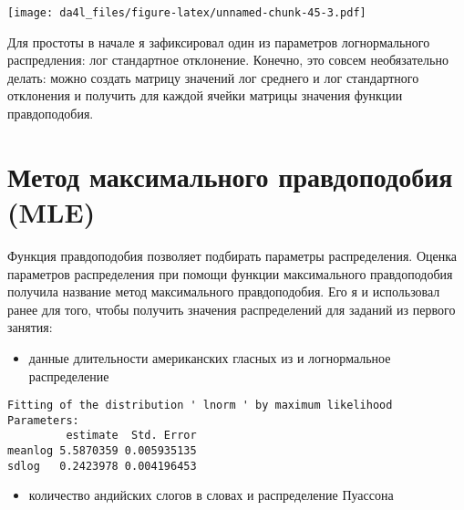\documentclass[
]{book}
\newenvironment{Shaded}{\begin{snugshade}}{\end{snugshade}}
\newcommand{\AttributeTok}[1]{\textcolor[rgb]{0.77,0.63,0.00}{#1}}
\newcommand{\FunctionTok}[1]{\textcolor[rgb]{0.00,0.00,0.00}{#1}}
\newcommand{\NormalTok}[1]{#1}
\newcommand{\SpecialCharTok}[1]{\textcolor[rgb]{0.00,0.00,0.00}{#1}}
\newcommand{\StringTok}[1]{\textcolor[rgb]{0.31,0.60,0.02}{#1}}
\providecommand{\tightlist}{%
  \setlength{\itemsep}{0pt}\setlength{\parskip}{0pt}}
\begin{document}
\texttt{[image: da4l\_files/figure-latex/unnamed-chunk-45-3.pdf]}

Для простоты в начале я зафиксировал один из параметров логнормального распредления: лог стандартное отклонение. Конечно, это совсем необязательно делать: можно создать матрицу значений лог среднего и лог стандартного отклонения и получить для каждой ячейки матрицы значения функции правдоподобия.

\hypertarget{ux43cux435ux442ux43eux434-ux43cux430ux43aux441ux438ux43cux430ux43bux44cux43dux43eux433ux43e-ux43fux440ux430ux432ux434ux43eux43fux43eux434ux43eux431ux438ux44f-mle}{%
\section{Метод максимального правдоподобия (MLE)}\label{ux43cux435ux442ux43eux434-ux43cux430ux43aux441ux438ux43cux430ux43bux44cux43dux43eux433ux43e-ux43fux440ux430ux432ux434ux43eux43fux43eux434ux43eux431ux438ux44f-mle}}

Функция правдоподобия позволяет подбирать параметры распределения. Оценка параметров распределения при помощи функции максимального правдоподобия получила название метод максимального правдоподобия. Его я и использовал ранее для того, чтобы получить значения распределений для заданий из первого занятия:

\begin{itemize}
\tightlist
\item
  данные длительности американских гласных из \citep{hillenbrand95} и логнормальное распределение
\end{itemize}

\begin{Shaded}
\end{Shaded}

\begin{verbatim}
Fitting of the distribution ' lnorm ' by maximum likelihood 
Parameters:
         estimate  Std. Error
meanlog 5.5870359 0.005935135
sdlog   0.2423978 0.004196453
\end{verbatim}

\begin{itemize}
\tightlist
\item
  количество андийских слогов в словах и распределение Пуассона
\end{itemize}
\end{document}
